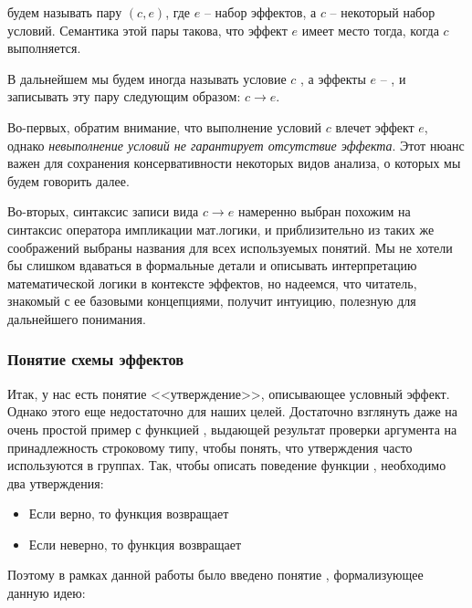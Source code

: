 \begin{definition}
    \label{def-cond-effect}
     будем называть пару $(c, e)$, где $e$ -- набор эффектов, а $c$ -- некоторый набор условий. Семантика этой пары такова, что эффект $e$ имеет место тогда, когда $c$ выполняется.  
    
    В дальнейшем мы будем иногда называть условие $c$ , а эффекты $e$ -- , и записывать эту пару следующим образом: $c \to e$.
   
\end{definition}

Во-первых, обратим внимание, что выполнение условий $c$ влечет эффект $e$, однако \emph{невыполнение условий не гарантирует отсутствие эффекта}. Этот нюанс важен для сохранения консервативности некоторых видов анализа, о которых мы будем говорить далее.

Во-вторых, синтаксис записи вида $c \to e$ намеренно выбран похожим на синтаксис оператора импликации мат.логики, и приблизительно из таких же соображений выбраны названия для всех используемых понятий. Мы не хотели бы слишком вдаваться в формальные детали и описывать интерпретацию математической логики в контексте эффектов, но надеемся, что читатель, знакомый с ее базовыми концепциями, получит интуицию, полезную для дальнейшего понимания.



\subsubsection{Понятие схемы эффектов}


Итак, у нас есть понятие <<утверждение>>, описывающее условный эффект. Однако этого еще недостаточно для наших целей. Достаточно взглянуть даже на очень простой пример с функцией , выдающей результат проверки аргумента на принадлежность строковому типу, чтобы понять, что утверждения часто используются в группах. Так, чтобы описать поведение функции , необходимо два утверждения:

\begin{itemize}
    \item Если  верно, то функция возвращает 
    
    \item Если  неверно, то функция возвращает 
\end{itemize}

Поэтому в рамках данной работы было введено понятие , формализующее данную идею:


